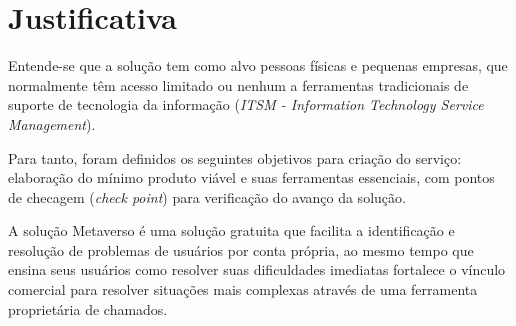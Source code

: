 	\section[Justificativa]{Justificativa}
	
			
		Entende-se que a solução tem como alvo pessoas físicas e pequenas empresas, que normalmente têm acesso limitado ou nenhum a ferramentas tradicionais de suporte de tecnologia da informação (\textit{ITSM - Information Technology Service Management}).
			
		Para tanto, foram definidos os seguintes objetivos para criação do serviço: elaboração do mínimo produto viável e suas ferramentas essenciais, com pontos de checagem (\textit{check point}) para verificação do avanço da solução.
		
		A solução Metaverso é uma solução gratuita que facilita a identificação e resolução de problemas de usuários por conta própria, ao mesmo tempo que ensina seus usuários como resolver suas dificuldades imediatas fortalece o vínculo comercial para resolver situações mais complexas através de uma ferramenta proprietária de chamados.
	

